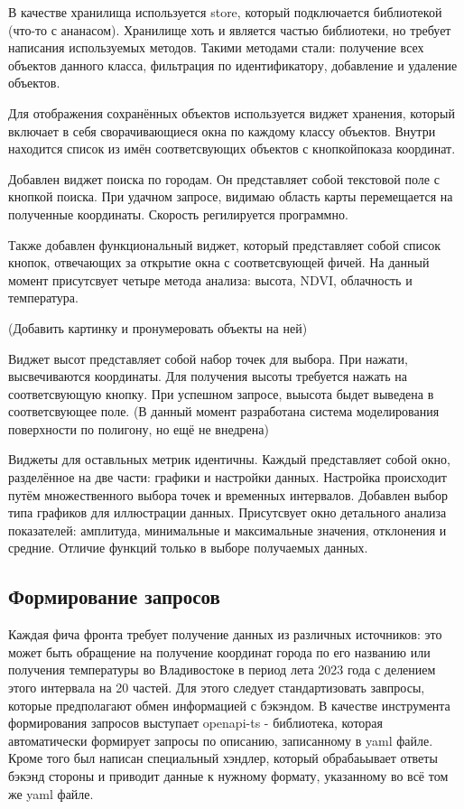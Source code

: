 В качестве хранилища используется store, который подключается библиотекой (что-то с ананасом). Хранилище хоть и является частью библиотеки, но требует написания используемых методов. Такими методами стали: получение всех объектов данного класса, фильтрация по идентификатору, добавление и удаление объектов.

Для отображения сохранённых объектов используется виджет хранения, который включает в себя сворачивающиеся окна по каждому классу объектов. Внутри находится список из имён соответсвующих объектов с кнопкойпоказа координат.

Добавлен виджет поиска по городам. Он представляет собой текстовой поле с кнопкой поиска. При удачном запросе, видимаю область карты перемещается на полученные координаты. Скорость регилируется программно.

Также добавлен функциональный виджет, который представляет собой список кнопок, отвечающих за открытие окна с соответсвующей фичей. На данный момент присутсвует четыре метода анализа: высота, NDVI, облачность и температура.

(Добавить картинку и пронумеровать объекты на ней)

Виджет высот представляет собой набор точек для выбора. При нажати, высвечиваются координаты. Для получения высоты требуется нажать на соответсвующую кнопку. При успешном запросе, выысота быдет выведена в соответсвующее поле. (В данный момент разработана система моделирования поверхности по полигону, но ещё не внедрена)

Виджеты для оставльных метрик идентичны. Каждый представляет собой окно, разделённое на две части: графики и настройки данных. Настройка происходит путём множественного выбора точек и временных интервалов. Добавлен выбор типа графиков для иллюстрации данных. Присутсвует окно детального анализа показателей: амплитуда, минимальные и максимальные значения, отклонения и средние.
Отличие функций только в выборе получаемых данных.

\subsection*{Формирование запросов}
Каждая фича фронта требует получение данных из различных источников: это может быть обращение на получение координат города по его названию или получения температуры во Владивостоке в период лета 2023 года с делением этого интервала на 20 частей. 
Для этого следует стандартизовать завпросы, которые предполагают обмен информацией с бэкэндом. В качестве инструмента формирования запросов выступает openapi-ts - библиотека, которая автоматически формирует запросы по описанию, записанному в yaml файле. Кроме того был написан специальный хэндлер, который обрабаьывает ответы бэкэнд стороны и приводит данные к нужному формату, указанному во всё том же yaml файле.

